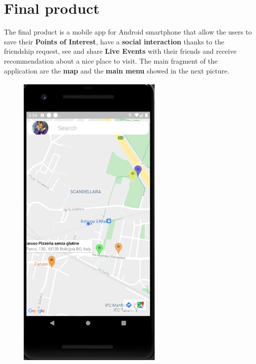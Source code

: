 \documentclass[../main]{subfiles}
\begin{document}
\section{Final product}
\label{s:app}
The final product is a mobile app for Android smartphone that allow the users to save their \textbf{Points of Interest}, have a \textbf{social interaction} 
 thanks to the friendship request, see and share \textbf{Live Events} with their friends and receive recommendation about a nice place to visit.
The main fragment of the application are the \textbf{map} and the \textbf{main menu} showed in the next picture.
\begin{figure}[H]
    \centering
    \includegraphics[width=70mm,height=150mm]{images/app/app_overview.png}

\end{figure}
\end{document}
